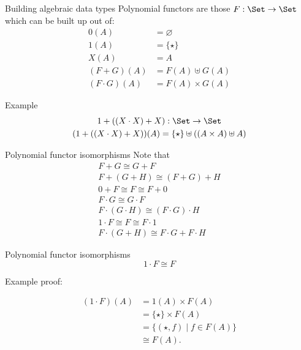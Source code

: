 \documentclass[xcolor=svgnames,12pt]{beamer}
\newenvironment{xframe}[1][]
  {\begin{frame}[fragile,environment=xframe,#1]}
  {\end{frame}}
\begin{document}
\begin{xframe}{Building algebraic data types}
  Polynomial functors are those $F : \Set \to \Set$ which can be built
  up out of:
  \begin{align*}
    0(A) &= \varnothing \\
    1(A) &= \{\star\} \\
    X(A) &= A \\
    (F + G)(A) &= F(A) \uplus G(A) \\
    (F \cdot G)(A) &= F(A) \times G(A)
  \end{align*}
\end{xframe}

\begin{xframe}{Example}
  \begin{gather*}
    1 + ((X \cdot X) + X) : \Set \to \Set \\
    (1 + ((X \cdot X) + X))(A) = \{\star\} \uplus ((A \times A) \uplus A)
  \end{gather*}
\end{xframe}

\begin{xframe}{Polynomial functor isomorphisms}
  Note that
  \begin{gather*}
    F + G \cong G + F \\
    F + (G + H) \cong (F + G) + H \\
    0 + F \cong F \cong F + 0 \\
    F \cdot G \cong G \cdot F \\
    F \cdot (G \cdot H) \cong (F \cdot G) \cdot H \\
    1 \cdot F \cong F \cong F \cdot 1 \\
    F \cdot (G + H) \cong F \cdot G + F \cdot H
  \end{gather*}
\end{xframe}

\begin{xframe}{Polynomial functor isomorphisms}
\[ 1 \cdot F \cong F \]

Example proof:

  \begin{align*}
    (1 \cdot F)(A) &= 1(A) \times F(A) \\
    &= \{\star\} \times F(A) \\
    &= \{(\star, f) \mid f \in F(A)\} \\
    &\cong F(A).
  \end{align*}
\end{xframe}
\end{document}
